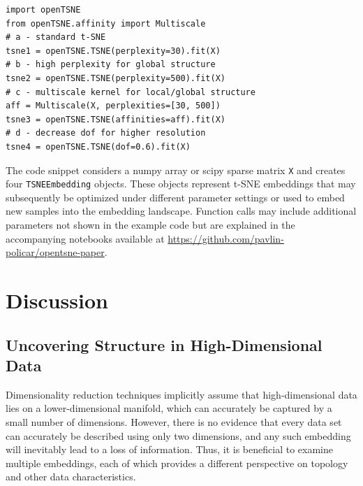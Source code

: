 \documentclass[twocolumn]{bmcart}
\begin{document}
\begin{verbatim}
import openTSNE
from openTSNE.affinity import Multiscale
# a - standard t-SNE
tsne1 = openTSNE.TSNE(perplexity=30).fit(X)
# b - high perplexity for global structure
tsne2 = openTSNE.TSNE(perplexity=500).fit(X)
# c - multiscale kernel for local/global structure
aff = Multiscale(X, perplexities=[30, 500])
tsne3 = openTSNE.TSNE(affinities=aff).fit(X)
# d - decrease dof for higher resolution
tsne4 = openTSNE.TSNE(dof=0.6).fit(X)
\end{verbatim}

\noindent The code snippet considers a \textsf{numpy} array or \textsf{scipy}
sparse matrix \texttt{X} and creates four \texttt{TSNEEmbedding} objects. These
objects represent t-SNE embeddings that may subsequently be optimized under
different parameter settings or used to embed new samples into the embedding
landscape. Function calls may include additional parameters not shown in the
example code but are explained in the accompanying notebooks available at
\url{https://github.com/pavlin-policar/opentsne-paper}.

\section*{Discussion}

\subsection*{Uncovering Structure in High-Dimensional Data}

Dimensionality reduction techniques implicitly assume that high-dimensional data
lies on a lower-dimensional manifold, which can accurately be captured by a
small number of dimensions. However, there is no evidence that every data set
can accurately be described using only two dimensions, and any such embedding
will inevitably lead to a loss of information. Thus, it is beneficial to examine
multiple embeddings, each of which provides a different perspective on topology
and other data characteristics.
\end{document}
